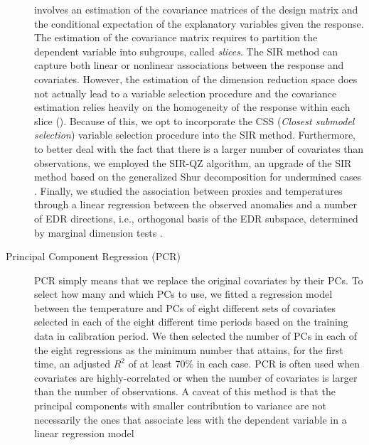 \documentclass[12pt]{amsart}
\theoremstyle{plain}
\theoremstyle{definition}
\theoremstyle{remark}
\begin{document}
\begin{description}
  involves an estimation of the covariance matrices of the design matrix and
  the conditional expectation of the explanatory variables given the
  response. The
  estimation of the covariance matrix requires to partition the dependent variable into subgroups, called \textit{slices}.
  The SIR method can capture both linear or nonlinear associations between the response and
  covariates. However, the estimation of the dimension
  reduction space does not actually lead to a variable selection procedure and the
  covariance estimation relies heavily on the homogeneity of the response within
  each slice (\cite{Wu2010}). Because of this, we opt to incorporate the CSS
  (\textit{Closest submodel selection}) variable 
  selection procedure into the SIR method. Furthermore, to better deal with the fact that there is a larger number of
  covariates than observations, we employed the SIR-QZ algorithm, an upgrade of the SIR method based on the generalized Shur decomposition for undermined cases \citep{Coudret2014,Coudret2017}.   
  Finally, we studied the association between proxies and temperatures
  through a linear regression between the observed anomalies and a number of EDR directions, i.e., orthogonal basis of the EDR subspace, determined by marginal dimension tests \citep{Cook2004}. 
\item[Principal Component Regression (PCR)]
PCR simply means that we replace the original covariates by their PCs. To select how many and which PCs to use, we fitted a regression model between the temperature and PCs of eight different sets of covariates selected in each of the eight different time periods based on the training data in calibration period. We then selected the number of PCs in each of
the eight regressions as the minimum number that attains, for the first time, an adjusted
$R^2$ of at least 70\% in each case. PCR is often used when covariates are
highly-correlated or when the number of covariates is larger than the number of 
 observations. A caveat of this method is that the principal components
with smaller contribution to variance are not necessarily the ones that
associate less with the dependent variable in a linear regression model 

\end{description}
\end{document}
